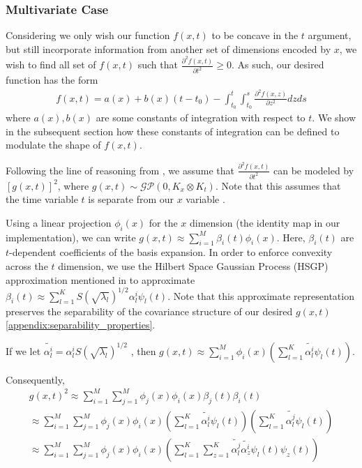 \subsubsection{Multivariate Case}
\label{appendix:multivariate_concavity}
Considering we only wish our function $f(x,t)$ to be concave in the $t$ argument, but still incorporate information from another set of dimensions encoded by $x$, we wish to find all set of $f(x,t)$ such that $\frac{\partial ^2 f(x,t)}{\partial t^2} \geq 0$. As such, our desired function has the form
\begin{align}
\label{eq:concave_multi_rep_app}
    f(x,t) = a(x) + b(x)(t-t_0) - \int_{t_0}^t \int_{t_0}^s \frac{\partial ^2 f(x,z)}{\partial z^2}dzds
\end{align}
where $a(x), b(x)$ are some constants of integration with respect to $t$. We show in the subsequent section how these constants of integration can be defined to modulate the shape of $f(x,t)$.


Following the line of reasoning from \cite{convexityconstraints}, we assume that $\frac{\partial ^2 f(x,t)}{\partial t^2}$ can be modeled by $[g(x,t)]^2$, where $g(x,t) \sim \mathcal{GP}(0, K_x \otimes K_t)$. Note that this assumes that the time variable $t$ is separate from our $x$ variable . 

Using a linear projection $\phi_i(x)$ for the $x$ dimension (the identity map in our implementation), we can write $g(x,t) \approx \sum_{i=1}^M \beta_i(t) \phi_i(x)$. Here, $\beta_i(t)$ are $t$-dependent coefficients of the basis expansion. In order to enforce convexity across the $t$ dimension, we use the Hilbert Space Gaussian Process (HSGP) approximation mentioned in \cite{convexityconstraints} to approximate $\beta_i(t) \approx \sum_{l=1}^K S(\sqrt{\lambda_l})^{1/2} \alpha_l^i \psi_l(t)$. Note that this approximate representation preserves the separability of the covariance structure of our desired $g(x,t)$
\ref{appendix:separability_properties}.

If we let $\tilde{\alpha_l^i} = \alpha_l^i S(\sqrt{\lambda_l})^{1/2}$  , then $g(x,t) \approx \sum_{i=1}^M \phi_i(x) ( \sum_{l=1}^K \tilde{\alpha_l^i} \psi_l(t))$. 

Consequently,
\begin{align}
\label{eq:deriv_approx_gp}
g(x,t)^2 \approx \sum_{i=1}^M \sum_{j=1}^M \phi_j(x)\phi_i(x) \beta_j(t) \beta_i(t) \nonumber \\
\approx \sum_{i=1}^M \sum_{j=1}^M \phi_j(x)\phi_i(x) (\sum_{l=1}^K \tilde{\alpha_l^i} \psi_l(t)) (\sum_{l=1}^K \tilde{\alpha_l^j} \psi_l(t)) \nonumber \\  
 \approx \sum_{i=1}^M \sum_{j=1}^M \phi_j(x)\phi_i(x) (\sum_{l=1}^K \sum_{z=1}^K\tilde{\alpha_l^j} \tilde{\alpha_z^i} \psi_l(t)\psi_z(t) ) 
\end{align}

